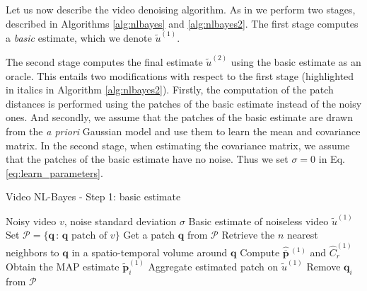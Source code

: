 \documentclass[10pt, journal, twocolumn, final, a4paper]{IEEEtran}
\newcommand{\ma}[1]{\boldsymbol{#1}}
\begin{document}
Let us now describe the video denoising algorithm. As in
\cite{Dabov2007tip,Dabov2007v,Maggioni2012,Lebrun2013a} we perform two stages, described in 
Algorithms \ref{alg:nlbayes} and \ref{alg:nlbayes2}. The first stage 
computes a \emph{basic} estimate, which we denote $\widetilde u^{(1)}$. 

The second stage computes the final estimate $\widetilde u^{(2)}$ using the
basic estimate as an oracle. This entails two modifications with respect to the
first stage (highlighted in italics in Algorithm \ref{alg:nlbayes2}). Firstly, the
computation of the patch distances is performed using the patches of the basic
estimate instead of the noisy ones. And secondly, we assume that the patches of
the basic estimate are drawn from the \textit{a priori} Gaussian model and use
them to learn the mean and covariance matrix. In the second stage,
when estimating the covariance matrix, we assume that the patches of the basic
estimate have no noise. Thus we set $\sigma = 0$ in Eq.
\eqref{eq:learn_parameters}.

\begin{algorithm}
	\caption{Video NL-Bayes - Step 1: basic estimate}
	\label{alg:nlbayes}
		\begin{algorithmic}[1]
		\REQUIRE Noisy video $v$, noise standard deviation
		$\sigma$
		\ENSURE Basic estimate of noiseless video $\widetilde u^{(1)}$
		\STATE Set $\mathcal P = \{\ma q \,:\, \ma q \text{ patch of }  v\}$ 
		\STATE Get a patch $\ma q$ from $\mathcal P$ 
			\STATE Retrieve  the $n$ nearest neighbors to $\ma
			q$ in a spatio-temporal volume around $\ma q$
			\STATE Compute $\widehat{\overline{\ma p}}\,\!^{(1)}$ and
			$\widehat C_{r}^{(1)}$ 
			\FORALL{$n$ neighbors $\ma q_i$ of $\ma q$}
				\STATE Obtain the MAP estimate $\widetilde{\ma p}_i^{(1)}$
				\STATE Aggregate estimated patch on $\widetilde u^{(1)}$
				\STATE Remove $\ma q_i$ from $\mathcal P$
			\ENDFOR
		\ENDWHILE
	\end{algorithmic}
\end{algorithm}
\end{document}
